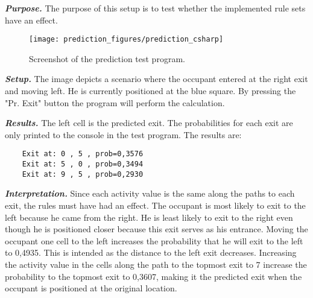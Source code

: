 \textit{\textbf{Purpose.}} The purpose of this setup is to test whether the implemented rule sets have an effect.
\begin{figure}[htb]
	\centering
	\texttt{[image: prediction\_figures/prediction\_csharp]}
	\caption{Screenshot of the prediction test program.}
	\label{fig:pred_c}
\end{figure}

\textit{\textbf{Setup.}} The image depicts a scenario where the occupant entered at the right exit and moving left. He is currently positioned at the blue square. By pressing the "Pr. Exit" button the program will perform the calculation. 

\textit{\textbf{Results.}} The left cell is the predicted exit. The probabilities for each exit are only printed to the console in the test program. The results are:
\begin{verbatim}
    Exit at: 0 , 5 , prob=0,3576
    Exit at: 5 , 0 , prob=0,3494
    Exit at: 9 , 5 , prob=0,2930
\end{verbatim}

\textit{\textbf{Interpretation.}} Since each activity value is the same along the paths to each exit, the rules must have had an effect. The occupant is most likely to exit to the left because he came from the right. He is least likely to exit to the right even though he is positioned closer because this exit serves as his entrance. Moving the occupant one cell to the left increases the probability that he will exit to the left to 0,4935. This is intended as the distance to the left exit decreases. Increasing the activity value in the cells along the path to the topmost exit to 7 increase the probability to the topmost exit to 0,3607, making it the predicted exit when the occupant is positioned at the original location.
